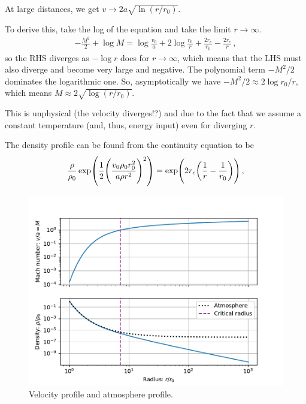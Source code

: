 \documentclass[main.tex]{subfiles}
\begin{document}
At large distances, we get \(v \rightarrow 2 a \sqrt{\ln(r/r_0)}\).

\begin{bluebox}
To derive this, take the log of the equation and take the limit \(r \rightarrow \infty \).
%
\begin{align}
-\frac{M^2}{2} + \log M 
= \log \frac{v_0 }{a} + 2 \log \frac{r_0 }{r} + \frac{2 r_c}{r_0 } - \frac{2 r_c}{r}
\,,
\end{align}
%
so the RHS diverges as \(- \log r\) does for \(r \rightarrow \infty\), which means that the LHS must also diverge and become very large and negative. The polynomial term \(-M^2/2\) dominates the logarithmic one.
So, asymptotically we have \(- M^2/2 \approx 2 \log r_0 /r \), which means \(M \approx 2 \sqrt{\log (r/r_0) }\).
\end{bluebox}

This is unphysical (the velocity diverges!?) and due  to the fact that we assume a constant temperature (and, thus, energy input) even for diverging \(r\). 

The density profile can be found from the continuity equation to be 
%
\begin{align}
\frac{\rho}{\rho_0} \exp(\frac{1}{2} \qty(\frac{v_0 \rho_0 r_0^2}{a \rho r^2})^2) = \exp(2 r_c \qty(\frac{1}{r} - \frac{1}{r_0}))
\,,
\end{align}
%
\begin{figure}[H]
\centering
\includegraphics[width=\textwidth]{figures/atmosphere_critical_radius.pdf}
\caption{Velocity profile and atmosphere profile.}
\label{fig:atmosphere_critical_radius}
\end{figure}
  
\end{document}
